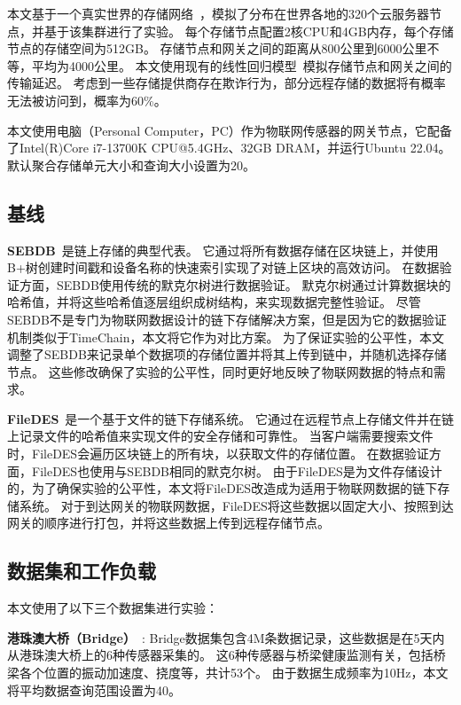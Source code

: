 本文基于一个真实世界的存储网络~\cite{corneo2021surrounded}，模拟了分布在世界各地的320个云服务器节点，并基于该集群进行了实验。
每个存储节点配置2核CPU和4GB内存，每个存储节点的存储空间为512GB。
存储节点和网关之间的距离从800公里到6000公里不等，平均为4000公里。
本文使用现有的线性回归模型~\cite{ziviani2005improving}模拟存储节点和网关之间的传输延迟。
考虑到一些存储提供商存在欺诈行为，部分远程存储的数据将有概率无法被访问到，概率为60\%。

本文使用电脑（Personal Computer，PC）作为物联网传感器的网关节点，它配备了Intel(R)Core i7-13700K CPU@5.4GHz、32GB DRAM，并运行Ubuntu 22.04。
默认聚合存储单元大小和查询大小设置为20。

\subsection{基线}
\textbf{SEBDB}~\cite{zhu2019sebdb}是链上存储的典型代表。
它通过将所有数据存储在区块链上，并使用B+树创建时间戳和设备名称的快速索引实现了对链上区块的高效访问。
在数据验证方面，SEBDB使用传统的默克尔树进行数据验证。
默克尔树通过计算数据块的哈希值，并将这些哈希值逐层组织成树结构，来实现数据完整性验证。
尽管SEBDB不是专门为物联网数据设计的链下存储解决方案，但是因为它的数据验证机制类似于TimeChain，本文将它作为对比方案。
为了保证实验的公平性，本文调整了SEBDB来记录单个数据项的存储位置并将其上传到链中，并随机选择存储节点。
这些修改确保了实验的公平性，同时更好地反映了物联网数据的特点和需求。

\textbf{FileDES}~\cite{xu2024filedes}是一个基于文件的链下存储系统。
它通过在远程节点上存储文件并在链上记录文件的哈希值来实现文件的安全存储和可靠性。
当客户端需要搜索文件时，FileDES会遍历区块链上的所有块，以获取文件的存储位置。
在数据验证方面，FileDES也使用与SEBDB相同的默克尔树。
由于FileDES是为文件存储设计的，为了确保实验的公平性，本文将FileDES改造成为适用于物联网数据的链下存储系统。
对于到达网关的物联网数据，FileDES将这些数据以固定大小、按照到达网关的顺序进行打包，并将这些数据上传到远程存储节点。

\subsection{数据集和工作负载}

本文使用了以下三个数据集进行实验：

\textbf{港珠澳大桥（Bridge）}~\cite{zhang2023edge}:
Bridge数据集包含4M条数据记录，这些数据是在5天内从港珠澳大桥上的6种传感器采集的。
这6种传感器与桥梁健康监测有关，包括桥梁各个位置的振动加速度、挠度等，共计53个。
由于数据生成频率为10Hz，本文将平均数据查询范围设置为40。

